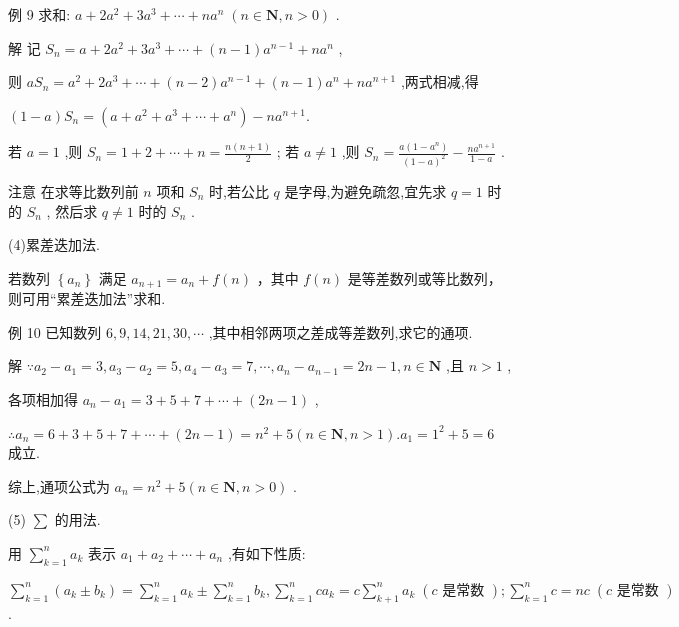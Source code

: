 \documentclass[10pt]{article}
\begin{document}
例 9 求和: \(a + 2{a}^{2} + 3{a}^{3} + \cdots  + n{a}^{n}\;\left( {n \in  \mathbf{N},n > 0}\right)\) .

解 记 \({S}_{n} = a + 2{a}^{2} + 3{a}^{3} + \cdots  + \left( {n - 1}\right) {a}^{n - 1} + n{a}^{n}\) ,

则 \(a{S}_{n} = {a}^{2} + 2{a}^{3} + \cdots  + \left( {n - 2}\right) {a}^{n - 1} + \left( {n - 1}\right) {a}^{n} + n{a}^{n + 1}\) ,两式相减,得

\(\left( {1 - a}\right) {S}_{n} = \left( {a + {a}^{2} + {a}^{3} + \cdots  + {a}^{n}}\right)  - n{a}^{n + 1}.\)

若 \(a = 1\) ,则 \({S}_{n} = 1 + 2 + \cdots  + n = \frac{n\left( {n + 1}\right) }{2}\) ; 若 \(a \neq  1\) ,则 \({S}_{n} = \frac{a\left( {1 - {a}^{n}}\right) }{{\left( 1 - a\right) }^{2}} - \frac{n{a}^{n + 1}}{1 - a}\) .

注意 在求等比数列前 \(n\) 项和 \({S}_{n}\) 时,若公比 \(q\) 是字母,为避免疏忽,宜先求 \(q = 1\) 时的 \({S}_{n}\) , 然后求 \(q \neq  1\) 时的 \({S}_{n}\) .

(4)累差迭加法.

若数列 \(\left\{  {a}_{n}\right\}\) 满足 \({a}_{n + 1} = {a}_{n} + f\left( n\right)\) ，其中 \(f\left( n\right)\) 是等差数列或等比数列，则可用“累差迭加法”求和.

例 10 已知数列 \(6,9,{14},{21},{30},\cdots\) ,其中相邻两项之差成等差数列,求它的通项.

解 \(\because {a}_{2} - {a}_{1} = 3,{a}_{3} - {a}_{2} = 5,{a}_{4} - {a}_{3} = 7,\cdots ,{a}_{n} - {a}_{n - 1} = {2n} - 1,n \in  \mathbf{N}\) ,且 \(n > 1\) ,

各项相加得 \({a}_{n} - {a}_{1} = 3 + 5 + 7 + \cdots  + \left( {{2n} - 1}\right)\) ,

\(\therefore {a}_{n} = 6 + 3 + 5 + 7 + \cdots  + \left( {{2n} - 1}\right)  = {n}^{2} + 5\left( {n \in  \mathbf{N},n > 1}\right) .{a}_{1} = {1}^{2} + 5 = 6\) 成立.

综上,通项公式为 \({a}_{n} = {n}^{2} + 5\left( {n \in  \mathbf{N},n > 0}\right)\) .

(5) \(\sum\) 的用法.

用 \(\mathop{\sum }\limits_{{k = 1}}^{n}{a}_{k}\) 表示 \({a}_{1} + {a}_{2} + \cdots  + {a}_{n}\) ,有如下性质:

\(\mathop{\sum }\limits_{{k = 1}}^{n}\left( {{a}_{k} \pm  {b}_{k}}\right)  = \mathop{\sum }\limits_{{k = 1}}^{n}{a}_{k} \pm  \mathop{\sum }\limits_{{k = 1}}^{n}{b}_{k},\mathop{\sum }\limits_{{k = 1}}^{n}c{a}_{k} = c\mathop{\sum }\limits_{{k + 1}}^{n}{a}_{k}\;\left( {c\text{ 是常数 }}\right) ;\mathop{\sum }\limits_{{k = 1}}^{n}c = {nc}\;\left( {c\text{ 是常数 }}\right)\) .
\end{document}
